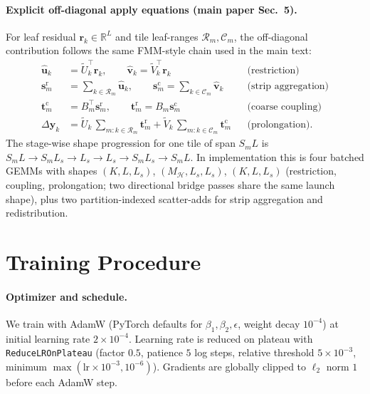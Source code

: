\documentclass[acmtog]{acmart}
\begin{document}
\paragraph{Explicit off-diagonal apply equations (main paper Sec.~5).}
For leaf residual $\mathbf{r}_k\!\in\!\mathbb{R}^{L}$ and tile leaf-ranges
$\mathcal{R}_m,\mathcal{C}_m$, the off-diagonal contribution follows the same
FMM-style chain used in the main text:
\begin{align}
  \hat{\mathbf{u}}_k &= \tilde U_k^\top\mathbf{r}_k,\qquad
  \hat{\mathbf{v}}_k = \tilde V_k^\top\mathbf{r}_k && \text{(restriction)} \\
  \mathbf{s}^{\mathrm{r}}_m &= \sum_{k\in\mathcal{R}_m}\hat{\mathbf{u}}_k,\qquad
  \mathbf{s}^{\mathrm{c}}_m = \sum_{k\in\mathcal{C}_m}\hat{\mathbf{v}}_k
  && \text{(strip aggregation)} \\
  \mathbf{t}^{\mathrm{c}}_m &= B_m^\top\mathbf{s}^{\mathrm{r}}_m,\qquad
  \mathbf{t}^{\mathrm{r}}_m = B_m\mathbf{s}^{\mathrm{c}}_m && \text{(coarse coupling)} \\
  \Delta\mathbf{y}_k &= \tilde U_k\,{\textstyle\sum_{m:k\in\mathcal{R}_m}\!\mathbf{t}^{\mathrm{r}}_m}
                    +  \tilde V_k\,{\textstyle\sum_{m:k\in\mathcal{C}_m}\!\mathbf{t}^{\mathrm{c}}_m}
  && \text{(prolongation).}
\end{align}
The stage-wise shape progression for one tile of span $S_mL$ is
$S_mL \rightarrow S_mL_s \rightarrow L_s \rightarrow L_s \rightarrow S_mL_s \rightarrow S_mL$.
In implementation this is four batched GEMMs with shapes
$(K,L,L_s)$, $(M_{\mathcal{H}},L_s,L_s)$, $(K,L,L_s)$ (restriction, coupling,
prolongation; two directional bridge passes share the same launch shape), plus two
partition-indexed scatter-adds for strip aggregation and redistribution.

\section{Training Procedure}
\label{supp:training}

\paragraph{Optimizer and schedule.}
We train with AdamW (PyTorch defaults for $\beta_1,\beta_2,\epsilon$,
weight decay $10^{-4}$) at initial learning rate $2\!\times\!10^{-4}$. Learning
rate is reduced on plateau with \texttt{ReduceLROnPlateau} (factor $0.5$,
patience $5$ log steps, relative threshold $5\!\times\!10^{-3}$, minimum
$\max(\mathrm{lr}\!\times\!10^{-3}, 10^{-6})$). Gradients are globally clipped to
$\ell_2$ norm $1$ before each AdamW step.
\end{document}
